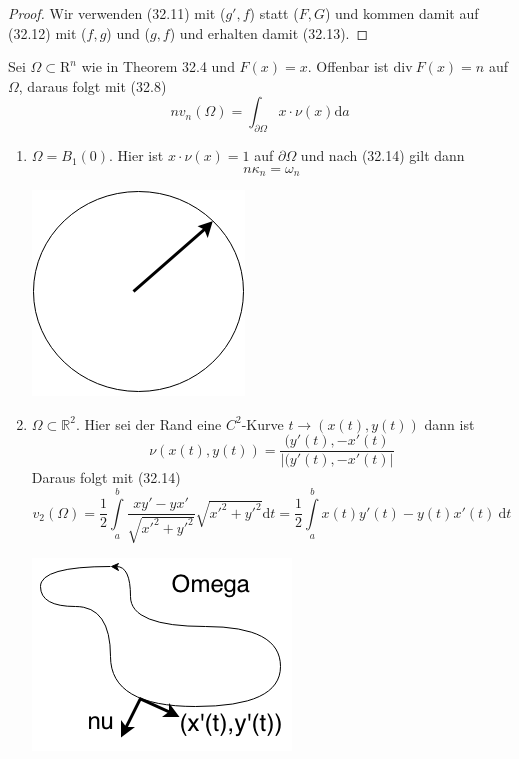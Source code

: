 \begin{proof}
Wir verwenden (32.11) mit ($g',f$) statt ($F,G$) und kommen 
damit auf (32.12) mit ($f,g$) und ($g,f$) und erhalten damit
(32.13).
\end{proof}

\begin{beispiel}
Sei $\Omega\subset\mathrm{R}^n$ wie in Theorem 32.4 und $F(x) = 
x$. Offenbar ist $\mathrm{div\ }F(x)=n$ auf $\Omega$, daraus 
folgt mit (32.8)
\begin{equation}
	nv_n(\Omega)=\int_{\partial\Omega}x\cdot\nu(x)\mathrm{d}a
\end{equation}
\begin{enumerate}
	\item  $\Omega=B_1(0)$. Hier ist $x\cdot\nu(x)=1$ auf
			$\partial\Omega$ und nach (32.14) gilt dann
			\begin{equation*}
				n\kappa_n=\omega_n
			\end{equation*}
			\begin{center}
				\includegraphics[scale=0.5]{pictures/008-01.png}				\end{center}			 
\newpage
	\item $\Omega\subset\mathbb{R}^2$. Hier sei der Rand eine 
			$C^2$-Kurve $t\rightarrow(x(t),y(t))$ dann ist
			\begin{equation*}
				\nu(x(t),y(t)) =
				\frac{(y'(t),-x'(t)}{|(y'(t),-x'(t)|}
			\end{equation*}
			Daraus folgt mit (32.14)
			\begin{equation*}
				v_2(\Omega) = 
				\frac{1}{2}\int\limits_a^b\frac{xy'-yx'}
				{\sqrt{x'^2+y'^2}}\sqrt{x'^2+y'^2}\mathrm{d}t = 
				\frac{1}{2}\int\limits_a^bx(t)y'(t)-y(t)x'(t) \ 
				\mathrm{d}t
			\end{equation*}
			\begin{center}
				\includegraphics[scale=0.5]{pictures/008-02.png}\end{center}	
\end{enumerate}
\end{beispiel}

